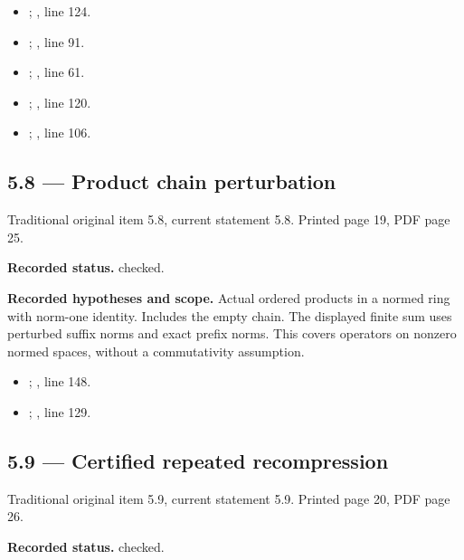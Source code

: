 \begin{itemize}
\item {}; , line 124.
\item {}; , line 91.
\item {}; , line 61.
\item {}; , line 120.
\item {}; , line 106.
\end{itemize}
\subsection{5.8 — Product chain perturbation}
\label{result:5.8}
{\footnotesize\color{muted}Traditional original item 5.8, current statement 5.8. Printed page 19, PDF page 25.}\par
\textbf{Recorded status.} checked.

\textbf{Recorded hypotheses and scope.} Actual ordered products in a normed ring with norm-one identity. Includes the empty chain. The displayed finite sum uses perturbed suffix norms and exact prefix norms. This covers operators on nonzero normed spaces, without a commutativity assumption.

\begin{itemize}
\item {}; , line 148.
\item {}; , line 129.
\end{itemize}
\subsection{5.9 — Certified repeated recompression}
\label{result:5.9}
{\footnotesize\color{muted}Traditional original item 5.9, current statement 5.9. Printed page 20, PDF page 26.}\par
\textbf{Recorded status.} checked.

